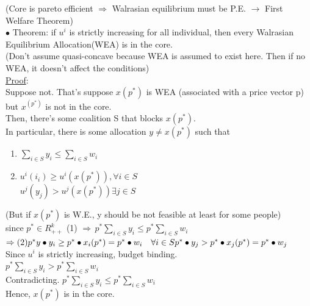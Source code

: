 \documentclass[letterpaper,13pt,single,pdftex]{scrartcl}
\begin{document}
(Core is pareto efficient $\Rightarrow$ Walrasian equilibrium must be P.E.  $\rightarrow$ First Welfare Theorem)\\
$\bullet$ Theorem: if $u^i$ is strictly increasing for all individual, then every Walrasian Equilibrium Allocation(WEA) is in the core.\\
(Don't assume quasi-concave because WEA is assumed to exist here. Then if no WEA, it doesn't affect the conditions)\\
\underline{Proof}:\\
Suppose not. That's suppose $x(p^*)$ is WEA (associated with a price vector p) but $x^(p^*)$ is not in the core. \\
Then, there's some coalition S that blocks $x(p^*)$.\\
In particular, there is some allocation $y\ne x(p^*)$ such that
\begin{enumerate}
    \item $\sum\limits_{i\in S} y_i \le \sum\limits_{i\in S} w_i$
    \item 
    $u^i(i_i)\ge u^i(x(p^*)), \forall i \in S $\\
    $u^j(y_j) > u^j(x(p^*)) \exists j \in S$
\end{enumerate}
    (But if $x(p^*)$ is W.E., y should be not feasible at least for some people)\\
    since $p^* \in R^k_{++}$ (1) $\Rightarrow \, p^* \sum\limits_{i\in S}y_i \le p^* \sum\limits_{i\in S}w_i $\\
    $\Rightarrow(2) p^*y \bullet y_i \ge p^* \bullet x_i(p^*) = p^* \bullet w_i \quad \forall i \in S\\
    p^*\bullet y_j > p^*\bullet x_j(p^*) = p^*\bullet w_j$\\
    Since $u^i$ is strictly increasing, budget binding. \\
    $p^*\sum\limits_{i\in S}y_i >p^* \sum\limits_{i\in S} w_i$\\
    Contradicting. $p^* \sum\limits_{i\in S}y_i \le p^* \sum\limits_{i\in S} w_i $\\
    Hence, $x(p^*)$ is in the core.\\
\end{document}
